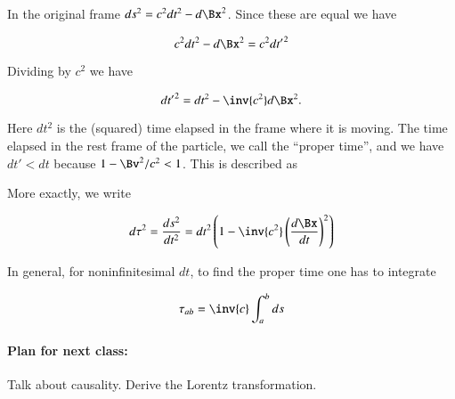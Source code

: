 In the original frame $ds^2 = c^2 dt^2 - d\Bx^2$.  Since these are equal we have

\begin{equation}\label{eqn:relativisticElectrodynamicsL3:110}
c^2 dt^2 - d\Bx^2 = c^2 {dt'}^2
\end{equation}

Dividing by $c^2$ we have

\begin{equation}\label{eqn:relativisticElectrodynamicsL3:115}
{dt'}^2 = dt^2 - \inv{c^2} d\Bx^2 .
\end{equation}

Here $dt^2$ is the (squared) time elapsed in the frame where it is moving.  The time elapsed in the rest frame of the particle, we call the ``proper time'', and we have $dt' < dt$ because $1 - \Bv^2/c^2 < 1$.  This is described as

More exactly, we write 

\begin{equation}\label{eqn:relativisticElectrodynamicsL3:120}
d\tau^2 = \frac{ds^2}{dt^2} = dt^2 \left( 1 - \inv{c^2} \left(\frac{d\Bx}{dt}\right)^2 \right)
\end{equation}

In general, for noninfinitesimal $dt$, to find the proper time one has to integrate 

\begin{equation}\label{eqn:relativisticElectrodynamicsL3:130}
\tau_{ab} = \inv{c} \int_a^b ds
\end{equation}

\paragraph{Plan for next class:}  Talk about causality.  Derive the Lorentz transformation.

\EndArticle
